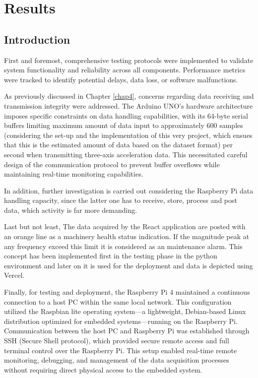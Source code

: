 \chapter{Results}
\label{chap5}

\section{Introduction}
{
	First and foremost, comprehensive testing protocols were implemented to validate system functionality and reliability across all components. Performance metrics were tracked to identify potential delays, data loss, or software malfunctions.  
	
	As previously discussed in Chapter \ref{chap4}, concerns regarding data receiving and  transmission integrity were addressed. The Arduino UNO's hardware architecture imposes specific constraints on data handling capabilities, with its 64-byte serial buffers limiting maximum amount of data input to approximately 600 samples (considering the set-up and the implementation of this very project, which ensues that this is the estimated amount of data based on the dataset format) per second when transmitting three-axis acceleration data. This necessitated careful design of the communication protocol to prevent buffer overflows while maintaining real-time monitoring capabilities.
	
	In addition, further investigation is carried out considering the Raspberry Pi data handling capacity, since the latter one has to receive, store, process and post data, which activity is far more demanding. 
	
	Last but not least, The data acquired by the React application are posted with an orange line as a machinery health status indication. If the magnitude peak at any frequency exceed this limit it is considered as an maintenance alarm. This concept has been implemented first in the testing phase in the python environment and later on it is used for the deployment and data is depicted using Vercel.
	
	Finally, for testing and deployment, the Raspberry Pi 4 maintained a continuous connection to a host PC within the same local network. This configuration utilized the Raspbian lite operating system—a lightweight, Debian-based Linux distribution optimized for embedded systems—running on the Raspberry Pi. Communication between the host PC and Raspberry Pi was established through SSH (Secure Shell protocol), which provided secure remote access and full terminal control over the Raspberry Pi. This setup enabled real-time remote monitoring, debugging, and management of the data acquisition processes without requiring direct physical access to the embedded system.   
}

